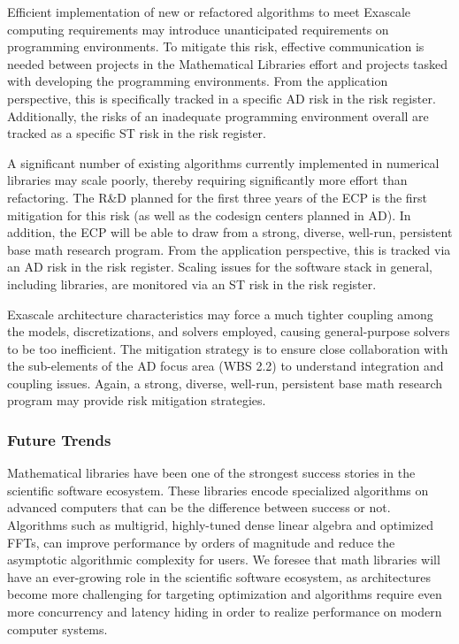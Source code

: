 Efficient implementation of new or refactored algorithms to meet Exascale computing requirements may introduce unanticipated requirements on programming environments. To mitigate this risk, effective communication is needed between projects in the Mathematical Libraries effort and projects tasked with developing the programming environments. From the application perspective, this is specifically tracked in a specific AD risk in the risk register. Additionally, the risks of an inadequate programming environment overall are tracked as a specific ST risk in the risk register.
  
A significant number of existing algorithms currently implemented in numerical libraries may scale poorly, thereby requiring significantly more effort than refactoring. The R\&D planned for the first three years of the ECP is the first mitigation for this risk (as well as the codesign centers planned in AD). In addition, the ECP will be able to draw from a strong, diverse, well-run, persistent base math research program. From the application perspective, this is tracked via an AD risk in the risk register. Scaling issues for the software stack in general, including libraries, are monitored via an ST risk in the risk register.

Exascale architecture characteristics may force a much tighter coupling among the models, discretizations, and solvers employed, causing general-purpose solvers to be too inefficient. The mitigation strategy is to ensure close collaboration with the sub-elements of the AD focus area (WBS 2.2) to understand integration and coupling issues. Again, a strong, diverse, well-run, persistent base math research program may provide risk mitigation strategies.

\subsubsection{Future Trends}
Mathematical libraries have been one of the strongest success stories in the scientific software ecosystem.  These libraries encode specialized algorithms on advanced computers that can be the difference between success or not.  Algorithms such as multigrid, highly-tuned dense linear algebra and optimized FFTs, can improve performance by orders of magnitude and reduce the asymptotic algorithmic complexity for users.  We foresee that math libraries will have an ever-growing role in the scientific software ecosystem, as architectures become more challenging for targeting optimization and algorithms require even more concurrency and latency hiding in order to realize performance on modern computer systems.

